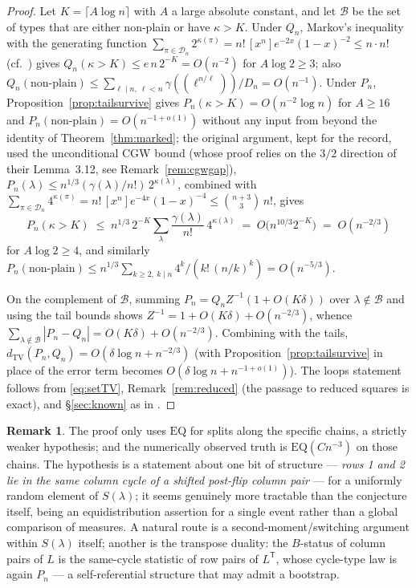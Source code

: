 \documentclass[11pt]{article}
\theoremstyle{definition}
\newtheorem{remark}[theorem]{Remark}
\newcommand{\dtv}{d_{\mathrm{TV}}}
\newcommand{\DD}{\mathcal{D}}
\newcommand{\PP}{P}
\newcommand{\QQ}{Q}
\begin{document}
\begin{proof}
Let $K=\lceil A\log n\rceil$ with $A$ a large absolute constant, and let
$\mathcal B$ be the set of types that are either non-plain or have
$\kappa>K$.  Under $\QQ_n$, Markov's inequality with the generating function
$\sum_{\pi\in\DD_n}2^{\kappa(\pi)}=n!\,[x^n]e^{-2x}(1-x)^{-2}\le n\cdot n!$
(cf.\ \cite[proof of Lemma~4.4]{CGW08}) gives
$\QQ_n(\kappa>K)\le e\,n\,2^{-K}=O(n^{-2})$ for $A\log2\ge3$; also
$\QQ_n(\text{non-plain})\le\sum_{\ell\mid n,\ \ell<n}
\gamma((\ell^{n/\ell}))/D_n=O(n^{-1})$.  Under $\PP_n$, Proposition~\ref{prop:tailsurvive} gives
$\PP_n(\kappa>K)=O(n^{-2}\log n)$ for $A\ge16$ and
$\PP_n(\text{non-plain})=O(n^{-1+o(1)})$ without any input from
\cite{CGW08} beyond the identity of Theorem~\ref{thm:marked}; the
original argument, kept for the record, used the unconditional
CGW bound \cite[Cor.~4.5]{CGW08} (whose proof relies on the $3/2$
direction of their Lemma~3.12, see Remark~\ref{rem:cgwgap}),
$\PP_n(\lambda)\le n^{1/3}(\gamma(\lambda)/n!)\,2^{\kappa(\lambda)}$,
combined with
$\sum_{\pi\in\DD_n}4^{\kappa(\pi)}=n!\,[x^n]e^{-4x}(1-x)^{-4}
\le \binom{n+3}{3}\,n!$, gives
\[
\PP_n(\kappa>K)\;\le\;n^{1/3}\,2^{-K}\sum_\lambda
\frac{\gamma(\lambda)}{n!}\,4^{\kappa(\lambda)}
\;=\;O\bigl(n^{10/3}2^{-K}\bigr)\;=\;O(n^{-2/3})
\]
for $A\log2\ge4$, and similarly
$\PP_n(\text{non-plain})\le n^{1/3}\sum_{k\ge2,\ k\mid n}
4^{k}/(k!\,(n/k)^{k})=O(n^{-5/3})$.

On the complement of $\mathcal B$, summing
$\PP_n=\QQ_n Z^{-1}(1+O(K\delta))$ over $\lambda\notin\mathcal B$ and using
the tail bounds shows $Z^{-1}=1+O(K\delta)+O(n^{-2/3})$, whence
$\sum_{\lambda\notin\mathcal B}|\PP_n-\QQ_n|=O(K\delta)+O(n^{-2/3})$.
Combining with the tails,
$\dtv(\PP_n,\QQ_n)=O(\delta\log n+n^{-2/3})$ (with
Proposition~\ref{prop:tailsurvive} in place of \cite[Cor.~4.5]{CGW08}
the error term becomes $O(\delta\log n+n^{-1+o(1)})$).  The loops statement follows
from \eqref{eq:setTV}, Remark~\ref{rem:reduced} (the passage to reduced
squares is exact), and \S\ref{sec:known} as in \cite[Lemma 6.2]{CGW08}.
\end{proof}

\begin{remark}
The proof only uses $\mathrm{EQ}$ for splits along the specific chains, a
strictly weaker hypothesis; and the numerically observed truth is
$\mathrm{EQ}(Cn^{-3})$ on those chains.  The hypothesis is a statement about
one bit of structure --- \emph{rows 1 and 2 lie in the same column cycle of a
shifted post-flip column pair} --- for a uniformly random element of
$S(\lambda)$; it seems genuinely more tractable than the conjecture itself,
being an equidistribution assertion for a single event rather than a global
comparison of measures.  A natural route is a second-moment/switching
argument within $S(\lambda)$ itself; another is the transpose duality: the
$B$-status of column pairs of $L$ is the same-cycle statistic of row pairs
of $L^{\mathsf T}$, whose cycle-type law is again $\PP_n$ --- a
self-referential structure that may admit a bootstrap.
\end{remark}
\end{document}
